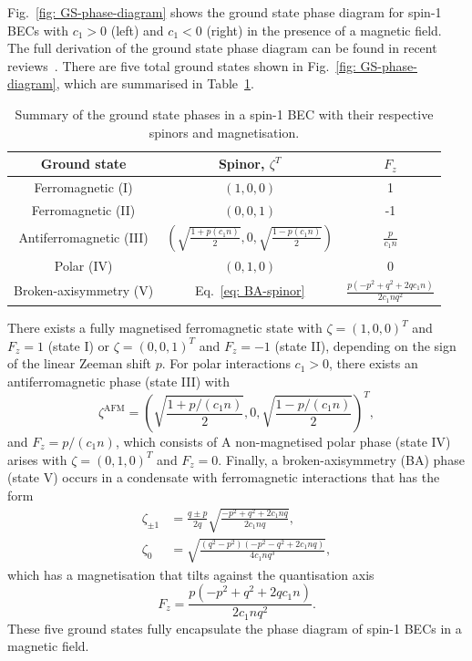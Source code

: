 Fig.~\ref{fig: GS-phase-diagram} shows the ground state phase diagram for spin-1
BECs with \(c_1 > 0\) (left) and \(c_1 < 0\) (right) in the presence of a
magnetic field.
The full derivation of the ground state phase diagram can be found in recent
reviews~\cite{Kawaguchi2012, StamperKurn2013}.
There are five total ground states shown in Fig.~\ref{fig: GS-phase-diagram},
which are summarised in Table~\ref{tab: spin-1-ground-states}.
\begin{table}
    \centering
    \begin{tabular}{ccc}
        \toprule
        Ground state & Spinor, \(\zeta^T\) & \(F_z\) \\
        \midrule
        Ferromagnetic (I) & \((1, 0, 0)\) & 1\\
        Ferromagnetic (II) & \((0, 0, 1)\) & -1\\
        Antiferromagnetic (III) & \(\left(\sqrt{\frac{1 + p(c_1n)}{2}}, 0,
        \sqrt{\frac{1 - p(c_1n)}{2}}\right)\) & \(\frac{p}{c_1n}\) \\
        Polar (IV) & \((0, 1, 0)\) & 0 \\
        Broken-axisymmetry (V) & Eq.~\eqref{eq: BA-spinor}
        & \(\frac{p(-p^2+q^2+2qc_1n)}{2c_1nq^2}\) \\
        \bottomrule
    \end{tabular}
    \caption{\label{tab: spin-1-ground-states}Summary of the ground state
    phases in a spin-1 BEC with their respective spinors and magnetisation.}
\end{table}
There exists a fully magnetised ferromagnetic state with \(\zeta={(1, 0, 0)}^T\)
and \(F_z=1\) (state I) or \(\zeta={(0, 0, 1)}^T\) and \(F_z=-1\) (state II),
depending on the sign of the linear Zeeman shift \(p\).
For polar interactions \(c_1 > 0\), there exists an antiferromagnetic phase
(state III) with
\begin{equation}
    \zeta^\mathrm{AFM} = {\left(\sqrt{\frac{1 + p/(c_1n)}{2}}, 0,
    \sqrt{\frac{1 - p/(c_1n)}{2}}\right)}^T,
\end{equation}
and \(F_z = p/(c_1n)\), which consists of 
A non-magnetised polar phase (state IV) arises with \(\zeta={(0, 1, 0)}^T\) and
\(F_z = 0\).
Finally, a broken-axisymmetry (BA) phase (state V) occurs in a condensate with
ferromagnetic interactions that has the form
\begin{equation}
    \begin{aligned}
        \zeta_{\pm 1} &= 
                    \frac{q \pm p}{2q}\sqrt{\frac{-p^2+q^2+2c_1nq}{2c_1nq}}, \\
        \zeta_0 &= \sqrt{\frac{(q^2-p^2)(-p^2-q^2+2c_1nq)}{4c_1nq^3}},
    \end{aligned}
    \label{eq: BA-spinor}
\end{equation}
which has a magnetisation that tilts against the quantisation axis
\begin{equation}
    F_z = \frac{p(-p^2 + q^2 + 2qc_1n)}{2c_1nq^2}.
\end{equation}
These five ground states fully encapsulate the phase diagram of spin-1 BECs
in a magnetic field.

